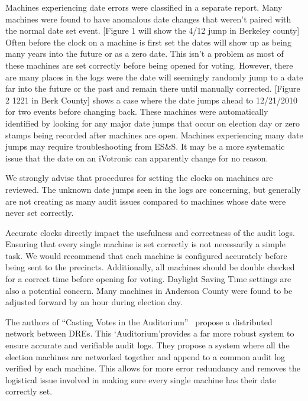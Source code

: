 Machines experiencing date errors were classified in a separate report.  Many machines were found to have anomalous date changes that weren't paired with the normal date set event. [Figure 1 will show the 4/12 jump in Berkeley county] Often before the clock on a machine is first set the dates will show up as being many years into the future or as a zero date.  This isn't a problem as most  of these machines are set correctly before being opened for voting.  However, there are many places in the logs were the date will seemingly randomly jump to a date far into the future or the past and remain there until manually corrected.  [Figure 2 12\/21 in Berk County] shows a case where the date jumps ahead to 12/21/2010 for two events before changing back.  These machines were automatically identified by looking for any major date jumps that occur on election day or zero stamps being recorded after machines are open. Machines experiencing many date jumps may require troubleshooting from ES\&S.  It may be a more systematic issue that the date on an iVotronic can apparently change for no reason.

We strongly advise that procedures for setting the clocks on machines are reviewed.  The unknown date jumps seen in the logs are concerning, but generally are not creating as many audit issues compared to machines whose date were never set correctly.

Accurate clocks directly impact the usefulness and correctness of the audit logs. Ensuring that every single machine is set correctly is not necessarily a simple task.  We would recommend that each machine is configured accurately before being sent to the precincts.  Additionally, all machines should be double checked for a correct time before opening for voting.  Daylight Saving Time settings are also a potential concern.  Many machines in Anderson County were found to be adjusted forward by an hour during election day.  

The authors of \textquotedblleft Casting Votes in the Auditorium\textquotedblright~\cite{Sandler2007} propose a distributed network between DREs.  This \textquoteleft Auditorium\textquoteright provides a far more robust system to ensure accurate and verifiable audit logs.  They propose a system where all the election machines are networked together and append to a common audit log verified by each machine.  This allows for more error redundancy and removes the logistical issue involved in making sure every single machine has their date correctly set.

